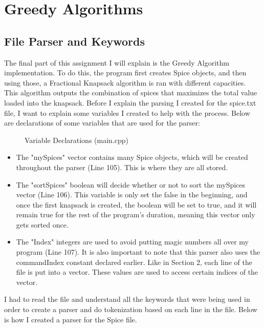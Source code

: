 \documentclass[letterpaper, 10pt]{article}
\begin{document}
\section{Greedy Algorithms}
\setcounter{figure}{0} %

\subsection{File Parser and Keywords}
\noindent
The final part of this assignment I will explain is the Greedy Algorithm implementation. To do this, the program first creates Spice objects, and then using those, a Fractional Knapsack algorithm is ran with different capacities. This algorithm outputs the combination of spices that maximizes the total value loaded into the knapsack. Before I explain the parsing I created for the spice.txt file, I want to explain some variables I created to help with the process. Below are declarations of some variables that are used for the parser:

\begin{figure}[H]
  \centering
   
  \caption{Variable Declarations (main.cpp)}
  \label{fig:figure3.1}
\end{figure}

\noindent
\begin{itemize}
    \item The "mySpices" vector contains many Spice objects, which will be created throughout the parser (Line 105). This is where they are all stored.
    \item The "sortSpices" boolean will decide whether or not to sort the mySpices vector (Line 106). This variable is only set the false in the beginning, and once the first knapsack is created, the boolean will be set to true, and it will remain true for the rest of the program's duration, meaning this vector only gets sorted once.
    \item The "Index" integers are used to avoid putting magic numbers all over my program (Line 107). It is also important to note that this parser also uses the commandIndex constant declared earlier. Like in Section 2, each line of the file is put into a vector. These values are used to access certain indices of the vector.
\end{itemize}

\noindent
I had to read the file and understand all the keywords that were being used in order to create a parser and do tokenization based on each line in the file. Below is how I created a parser for the Spice file.
\end{document}
